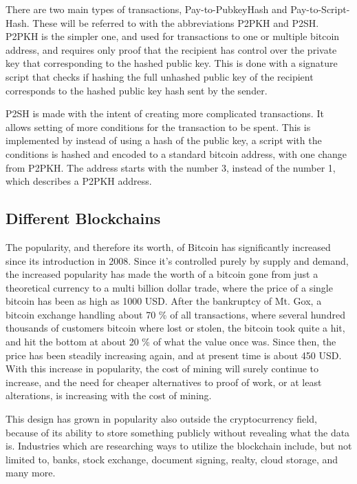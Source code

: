 \documentclass[11pt]{article}
\begin{document}
There are two main types of transactions, Pay-to-PubkeyHash and Pay-to-Script-Hash.	These will be referred to with the abbreviations P2PKH and P2SH. P2PKH is the simpler one, and used for transactions to one or multiple bitcoin address, and requires only proof that the recipient has control over the private key that corresponding to the hashed public key. This is done with a signature script that checks if hashing the full unhashed public key of the recipient corresponds to the hashed public key hash sent by the sender.

P2SH is made with the intent of creating more complicated transactions. It allows setting of more conditions for the transaction to be spent. This is implemented by instead of using a hash of the public key, a script with the conditions is hashed and encoded to a standard bitcoin address, with one change from P2PKH. The address starts with the number 3, instead of the number 1, which describes a P2PKH address. 
\subsection{Different Blockchains}

The popularity, and therefore its worth, of Bitcoin has significantly increased since its introduction in 2008. Since it's controlled purely by supply and demand, the increased popularity has made the worth of a bitcoin gone from just a theoretical currency to a multi billion dollar trade, where the price of a single bitcoin has been as high as 1000 USD. After the bankruptcy of Mt. Gox, a bitcoin exchange handling about 70 \% of all transactions, where several hundred thousands of customers bitcoin where lost or stolen, the bitcoin took quite a hit, and hit the bottom at about 20 \% of what the value once was. Since then, the price has been steadily increasing again, and at present time is about 450 USD. With this increase in popularity, the cost of mining will surely continue to increase, and the need for cheaper alternatives to proof of work, or at least alterations, is increasing with the cost of mining.  

This design has grown in popularity also outside the cryptocurrency field, because of its ability to store something publicly without revealing what the data is. Industries which are researching ways to utilize the blockchain include, but not limited to, banks, stock exchange, document signing, realty, cloud storage, and many more. 
\end{document}
